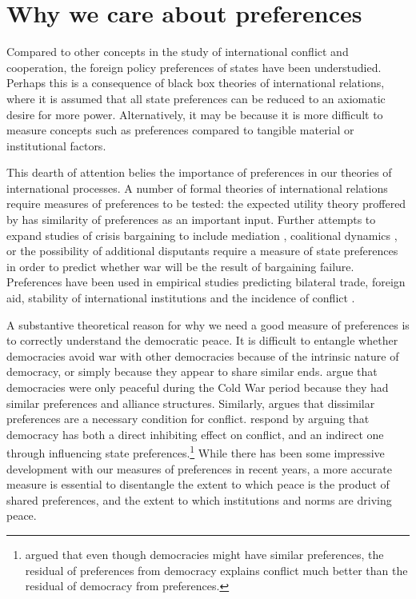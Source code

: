 \section*{Why we care about preferences}

Compared to other concepts in the study of international conflict and cooperation, the foreign policy preferences of states have been understudied. Perhaps this is a consequence of black box theories of international relations, where it is assumed that all state preferences can be reduced to an axiomatic desire for more power. Alternatively, it may be because it is more difficult to measure concepts such as preferences compared to tangible material or institutional factors.

This dearth of attention belies the importance of preferences in our theories of international processes. A number of formal theories of international relations require measures of preferences to be tested: the expected utility theory proffered by \citep{buenodemesquita:1983} has similarity of preferences as an important input. Further attempts to expand studies of crisis bargaining to include mediation \citep{kydd:2003}, coalitional dynamics \citep{wolford:2014}, or the possibility of additional disputants \citep{gallop:2017} require a measure of state preferences in order to predict whether war will be the result of bargaining failure. Preferences have been used in empirical studies predicting bilateral trade, foreign aid, stability of international institutions and the incidence of conflict \citep{derouen:heo:2004, stone:2004, gartzke:2007, kastner:2007, braumoeller:2008}. 

A substantive theoretical reason for why we need a good measure of preferences is to correctly understand the democratic peace. It is difficult to entangle whether democracies avoid war with other democracies because of the intrinsic nature of democracy, or simply because they appear to share similar ends. \citet{farber:gowa:1995} argue that democracies were only peaceful during the Cold War period because they had similar preferences and alliance structures. Similarly, \citet{gartzke:1998} argues that dissimilar preferences are a necessary condition for conflict. \citet{oneal:russett:1999e} respond by arguing that democracy has both a direct inhibiting effect on conflict, and an indirect one through influencing state preferences.\footnote{\citet{gartzke:2000} argued that even though democracies might have similar preferences, the residual of preferences from democracy explains conflict much better than the residual of democracy from preferences.} While there has been some impressive development with our measures of preferences in recent years, a more accurate measure is essential to disentangle the extent to which peace is the product of shared preferences, and the extent to which institutions and norms are driving peace.

